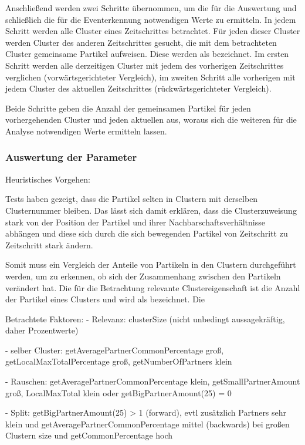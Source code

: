 Anschließend werden zwei Schritte übernommen, um die für die Auswertung und schließlich die für die Eventerkennung notwendigen Werte zu ermitteln. In jedem Schritt werden alle Cluster eines Zeitschrittes betrachtet. Für jeden dieser Cluster werden Cluster des anderen Zeitschrittes gesucht, die mit dem betrachteten Cluster gemeinsame Partikel aufweisen. Diese werden als  bezeichnet. Im ersten Schritt werden alle derzeitigen Cluster mit jedem des vorherigen Zeitschrittes verglichen (vorwärtsgerichteter Vergleich), im zweiten Schritt alle vorherigen mit jedem Cluster des aktuellen Zeitschrittes (rückwärtsgerichteter Vergleich).

Beide Schritte geben die Anzahl der gemeinsamen Partikel für jeden vorhergehenden Cluster und jeden aktuellen aus, woraus sich die weiteren für die Analyse notwendigen Werte ermitteln lassen.

\subsubsection{Auswertung der Parameter}

Heuristisches Vorgehen:

Tests haben gezeigt, dass die Partikel selten in Clustern mit derselben Clusternummer bleiben. Das lässt sich damit erklären, dass die Clusterzuweisung stark von der Position der Partikel und ihrer Nachbarschaftsverhältnisse abhängen und diese sich durch die sich bewegenden Partikel von Zeitschritt zu Zeitschritt stark ändern.

Somit muss ein Vergleich der Anteile von Partikeln in den Clustern durchgeführt werden, um zu erkennen, ob sich der Zusammenhang zwischen den Partikeln verändert hat. Die für die Betrachtung relevante Clustereigenschaft ist die Anzahl der Partikel eines Clusters und wird als  bezeichnet. Die 

Betrachtete Faktoren:
- Relevanz: clusterSize (nicht unbedingt aussagekräftig, daher Prozentwerte)

- selber Cluster: getAveragePartnerCommonPercentage groß, getLocalMaxTotalPercentage groß, getNumberOfPartners klein

- Rauschen: getAveragePartnerCommonPercentage klein, getSmallPartnerAmount groß, LocalMaxTotal klein oder  getBigPartnerAmount(25) = 0

- Split: getBigPartnerAmount(25) > 1 (forward), evtl zusätzlich Partners sehr klein und getAveragePartnerCommonPercentage mittel (backwards) bei großen Clustern size und getCommonPercentage hoch

